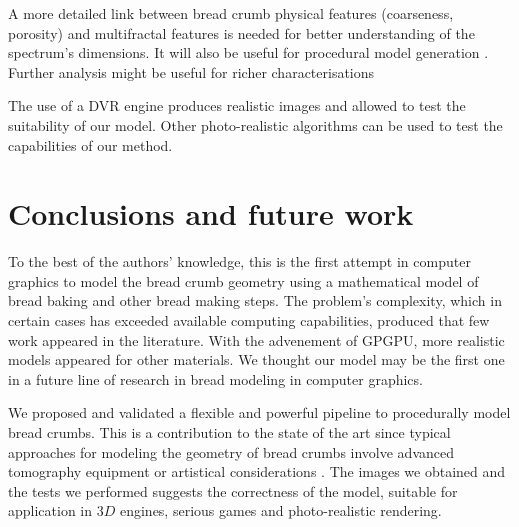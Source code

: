 \documentclass[final,5p,times]{elsarticle}
\begin{document}
{%

A more detailed link between bread crumb physical features (coarseness, porosity) and multifractal features is needed for better understanding of the spectrum's dimensions. It will also be useful for procedural model generation \cite{Baravalle2012}. Further analysis might be useful for richer characterisations

The use of a DVR engine produces realistic images and allowed to test the suitability of our model. Other photo-realistic algorithms can be used to test the capabilities of our method.


\section{Conclusions and future work}


To the best of the authors' knowledge, this is the first attempt in computer graphics to model the bread crumb geometry using a mathematical model of bread baking and other bread making steps. The problem's complexity, which in certain cases has exceeded available computing capabilities, produced that few work appeared in the literature. With the advenement of GPGPU, more realistic models appeared for other materials. We thought our model may be the first one in a future line of research in bread modeling in computer graphics. 

We proposed and validated a flexible and powerful pipeline to procedurally model bread crumbs. This is a contribution to the state of the art since typical approaches for modeling the geometry of bread crumbs involve advanced tomography equipment \cite{VanDyck2014} or artistical considerations \cite{Cho2007}. The images we obtained and the tests we performed  suggests the correctness of the model, suitable for application in $3D$ engines, serious games and photo-realistic rendering.

}
\end{document}
